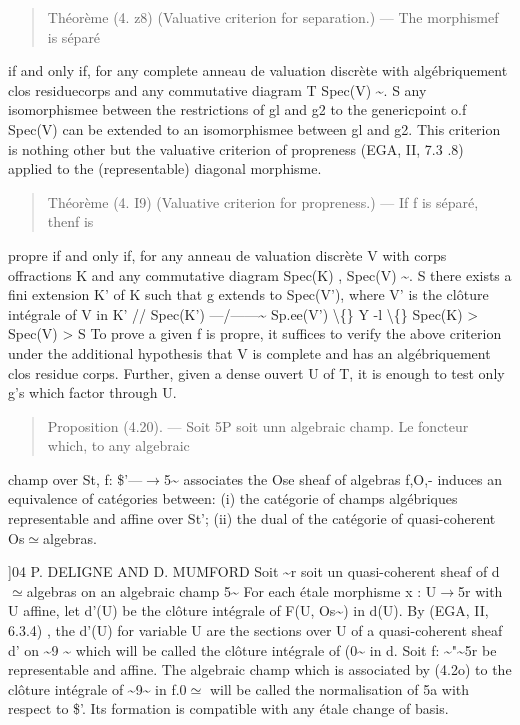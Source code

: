 \documentclass[11pt]{article}
\theoremstyle{plain}
\theoremstyle{definition}
\theoremstyle{remark}
\begin{document}
\begin{quote}Th\'eor\`eme (4. z8) (Valuative criterion for separation.) --- The morphismef is s\'epar\'e\end{quote}
if and only if, for any complete anneau de valuation discr\`ete with alg\'ebriquement clos residuecorps and any commutative diagram T Spec(V) \textasciitilde{}. S any isomorphismee between the restrictions of gl and g2 to the genericpoint o.f Spec(V) can be extended to an isomorphismee between gl and g2. This criterion is nothing other but the valuative criterion of propreness (EGA, II, 7.3 .8) applied to the (representable) diagonal morphisme.

\begin{quote}Th\'eor\`eme (4. I9) (Valuative criterion for propreness.) --- If f is s\'epar\'e, thenf is\end{quote}
propre if and only if, for any anneau de valuation discr\`ete V with corps offractions K and any commutative diagram Spec(K) , Spec(V) \textasciitilde{}. S there exists a fini extension K' of K such that g extends to Spec(V'), where V' is the cl\^oture int\'egrale of V in K' // Spec(K') ---/------\textasciitilde{} Sp.ee(V') \textbackslash\{\} Y -l \textbackslash\{\} Spec(K) > Spec(V) > S To prove a given f is propre, it suffices to verify the above criterion under the additional hypothesis that V is complete and has an alg\'ebriquement clos residue corps. Further, given a dense ouvert U of T, it is enough to test only g's which factor through U.

\begin{quote}Proposition (4.20). --- Soit 5P soit unn algebraic champ. Le foncteur which, to any algebraic\end{quote}
champ over St, f: \$'---$\to$5\textasciitilde{} associates the Ose sheaf of algebras f,O,- induces an equivalence of cat\'egories between: (i) the cat\'egorie of champs alg\'ebriques representable and affine over St'; (ii) the dual of the cat\'egorie of quasi-coherent Os$\simeq$algebras.

]04 P. DELIGNE AND D. MUMFORD Soit \textasciitilde{}r soit un quasi-coherent sheaf of d$\simeq$algebras on an algebraic champ 5\textasciitilde{} For each \'etale morphisme x : U$\to$5r with U affine, let d'(U) be the cl\^oture int\'egrale of F(U, Os\textasciitilde{}) in d(U). By (EGA, II, 6.3.4) , the d'(U) for variable U are the sections over U of a quasi-coherent sheaf d' on \textasciitilde{}9 \textasciitilde{} which will be called the cl\^oture int\'egrale of (0\textasciitilde{} in d. Soit f: \textasciitilde{}"\textasciitilde{}5r be representable and affine. The algebraic champ which is associated by (4.2o) to the cl\^oture int\'egrale of \textasciitilde{}9\textasciitilde{} in f.0$\simeq$ will be called the normalisation of 5a with respect to \$'. Its formation is compatible with any \'etale change of basis.
\end{document}
